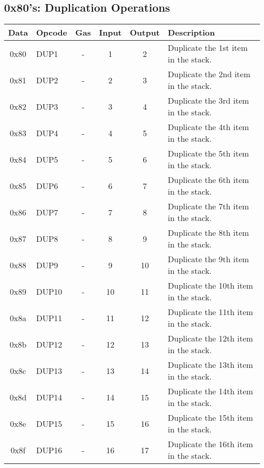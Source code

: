\documentclass[10pt,a4paper,leqno,bibliography=totoc]{scrartcl}
\newenvironment{alphafootnotes}
{\par\edef\savedfootnotenumber{\number\value{footnote}}
\renewcommand{\thefootnote}{\alph{footnote}}
\setcounter{footnote}{0}}
{\par\setcounter{footnote}{\savedfootnotenumber}}
\begin{document}
\begin{alphafootnotes}
		\subsection{0x80's: Duplication Operations}
			\begin{longtable}{|cP{2.8cm}cccp{6cm}|}
		        \hline
		        \textbf{Data} & \textbf{Opcode} & \textbf{Gas}  & \textbf{Input}  & \textbf{Output} & \textbf{Description} \\
		        \hline
			0x80 & DUP1 & - & 1 & 2 & Duplicate the 1st item in the stack. \\
			0x81 & DUP2 & - & 2 & 3 & Duplicate the 2nd item in the stack. \\
			0x82 & DUP3 & - & 3 & 4 & Duplicate the 3rd item in the stack. \\
			0x83 & DUP4 & - & 4 & 5 & Duplicate the 4th item in the stack. \\
			0x84 & DUP5 & - & 5 & 6 & Duplicate the 5th item in the stack. \\
			0x85 & DUP6 & - & 6 & 7 & Duplicate the 6th item in the stack. \\
			0x86 & DUP7 & - & 7 & 8 & Duplicate the 7th item in the stack. \\
			0x87 & DUP8 & - & 8 & 9 & Duplicate the 8th item in the stack. \\
			0x88 & DUP9 & - & 9 & 10 & Duplicate the 9th item in the stack. \\
			0x89 & DUP10 & - & 10 & 11 & Duplicate the 10th item in the stack. \\
			0x8a & DUP11 & - & 11 & 12 & Duplicate the 11th item in the stack. \\
			0x8b & DUP12 & - & 12 & 13 & Duplicate the 12th item in the stack. \\
			0x8c & DUP13 & - & 13 & 14 & Duplicate the 13th item in the stack. \\
			0x8d & DUP14 & - & 14 & 15 & Duplicate the 14th item in the stack. \\
			0x8e & DUP15 & - & 15 & 16 & Duplicate the 15th item in the stack. \\
			0x8f & DUP16 & - & 16 & 17 & Duplicate the 16th item in the stack. \\		
			\hline
			\end{longtable}
        
	

\end{alphafootnotes}
\end{document}
